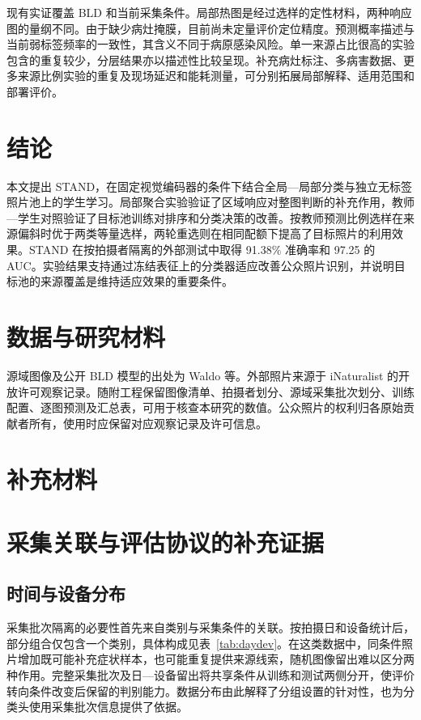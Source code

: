 \documentclass[11pt,a4paper,UTF8,fontset=windows,scheme=plain]{ctexart}
\begin{document}
现有实证覆盖 BLD 和当前采集条件。局部热图是经过选样的定性材料，两种响应图的量纲不同。由于缺少病灶掩膜，目前尚未定量评价定位精度。预测概率描述与当前弱标签频率的一致性，其含义不同于病原感染风险。单一来源占比很高的实验包含的重复较少，分层结果亦以描述性比较呈现。补充病灶标注、多病害数据、更多来源比例实验的重复及现场延迟和能耗测量，可分别拓展局部解释、适用范围和部署评价。

\section{结论}
\label{sec:conclusion}
本文提出 STAND，在固定视觉编码器的条件下结合全局—局部分类与独立无标签照片池上的学生学习。局部聚合实验验证了区域响应对整图判断的补充作用，教师—学生对照验证了目标池训练对排序和分类决策的改善。按教师预测比例选样在来源偏斜时优于两类等量选样，两轮重选则在相同配额下提高了目标照片的利用效果。STAND 在按拍摄者隔离的外部测试中取得 91.38\% 准确率和 97.25 的 AUC。实验结果支持通过冻结表征上的分类器适应改善公众照片识别，并说明目标池的来源覆盖是维持适应效果的重要条件。

\section*{数据与研究材料}
源域图像及公开 BLD 模型的出处为 Waldo 等\cite{waldo2026}。外部照片来源于 iNaturalist 的开放许可观察记录。随附工程保留图像清单、拍摄者划分、源域采集批次划分、训练配置、逐图预测及汇总表，可用于核查本研究的数值。公众照片的权利归各原始贡献者所有，使用时应保留对应观察记录及许可信息。


\FloatBarrier
\begingroup
\small\linespread{1.0}\selectfont
\setlength{\bibsep}{4pt}


\endgroup

\clearpage
\appendix
\section*{补充材料}
\section{采集关联与评估协议的补充证据}
\subsection{时间与设备分布}
采集批次隔离的必要性首先来自类别与采集条件的关联。按拍摄日和设备统计后，部分组合仅包含一个类别，具体构成见表~\ref{tab:daydev}。在这类数据中，同条件照片增加既可能补充症状样本，也可能重复提供来源线索，随机图像留出难以区分两种作用。完整采集批次及日—设备留出将共享条件从训练和测试两侧分开，使评价转向条件改变后保留的判别能力。数据分布由此解释了分组设置的针对性，也为分类头使用采集批次信息提供了依据。
\end{document}
